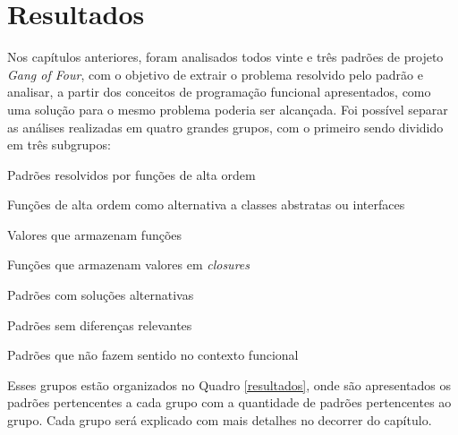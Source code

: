 \chapter{Resultados}

Nos capítulos anteriores, foram analisados todos 
vinte e três padrões de projeto \textit{Gang of 
Four}, com o objetivo de extrair o problema 
resolvido pelo padrão e analisar, a partir dos 
conceitos de programação funcional apresentados, 
como uma solução para o mesmo problema poderia ser 
alcançada. Foi possível separar as análises realizadas em 
quatro grandes grupos, com o primeiro sendo 
dividido em três subgrupos: 

\begin{alineas}
    \item Padrões resolvidos por funções de alta ordem
    \begin{alineas}
        \item Funções de alta ordem como alternativa a classes abstratas ou interfaces
        \item Valores que armazenam funções
        \item Funções que armazenam valores em \textit{closures}
    \end{alineas}
    \item Padrões com soluções alternativas
    \item Padrões sem diferenças relevantes
    \item Padrões que não fazem sentido no contexto funcional
\end{alineas}

Esses grupos estão organizados no Quadro 
\ref{resultados}, onde são apresentados os 
padrões pertencentes a cada grupo com a 
quantidade de padrões pertencentes ao grupo. 
Cada grupo será explicado com mais detalhes 
no decorrer do capítulo.


